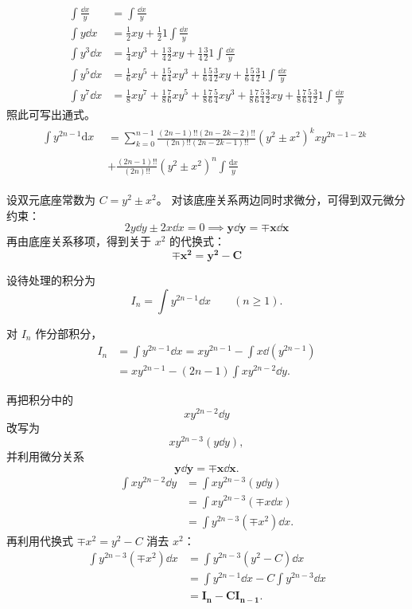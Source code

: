 \begin{theorem}[正奇次幂型]
\vspace{-15pt}
\begin{align*}
\int \frac{\dd x}{y}&=\int \frac{\dd x}{y}\\
\int y\dd x&=\frac12 xy+\frac121\int \frac{\dd x}{y}\\
\int y^3\dd x&=\frac14 xy^3+\frac14\frac32 xy+\frac14\frac321\int\frac{\dd x}{y}\\
\int y^5\dd x&=\frac16 xy^5+\frac16\frac54 xy^3+\frac16\frac54\frac32 xy +\frac16\frac54\frac321\int\frac{\dd x}{y}\\
\int y^7\dd x&=\frac18 xy^7+\frac18\frac76 xy^5+\frac18\frac76\frac54 xy^3+\frac18\frac76\frac54\frac32 xy +\frac18\frac76\frac54\frac321\int\frac{\dd x}{y}
\end{align*}
照此可写出通式。
\begin{align*}\int y^{2n-1}\mathrm{d}x&\begin{aligned}=\sum_{k=0}^{n-1}\frac{(2n-1)!!\left(2n-2k-2\right)!!}{(2n)!!\left(2n-2k-1\right)!!}\left(y^2\pm x^2\right)^kxy^{2n-1-2k}\end{aligned}\\&\begin{aligned}+\frac{(2n-1)!!}{(2n)!!}\left(y^2\pm x^2\right)^n\int\frac{\mathrm{d}x}{y}\end{aligned}\end{align*}
\end{theorem}
设双元底座常数为 $C = y^2 \pm x^2$。
对该底座关系两边同时求微分，可得到双元微分约束：
$$ 2y \dd y \pm 2x \dd x = 0 \implies \mathbf{y \dd y = \mp x \dd x} $$
再由底座关系移项，得到关于 $x^2$ 的代换式：
$$ \mathbf{\mp x^2 = y^2 - C} $$

设待处理的积分为
\[
I_n = \int y^{2n-1} \dd x \qquad (n \ge 1).
\]

对 $I_n$ 作分部积分，
\begin{align*}
I_n &= \int y^{2n-1} \dd x = x y^{2n-1} - \int x \dd\left(y^{2n-1}\right) \\
&= x y^{2n-1} - (2n-1) \int x y^{2n-2} \dd y.
\end{align*}

再把积分中的
\[
x y^{2n-2} \dd y
\]
改写为
\[
x y^{2n-3}(y\dd y),
\]
并利用微分关系
\[
\mathbf{y \dd y = \mp x \dd x}.
\]
\begin{align*}
\int x y^{2n-2} \dd y &= \int x y^{2n-3} (y \dd y) \\
&= \int x y^{2n-3} (\mp x \dd x) \\
&= \int y^{2n-3} (\mp x^2) \dd x.
\end{align*}
再利用代换式 $\mp x^2 = y^2 - C$ 消去 $x^2$：
\begin{align*}
\int y^{2n-3} (\mp x^2) \dd x &= \int y^{2n-3} (y^2 - C) \dd x \\
&= \int y^{2n-1} \dd x - C \int y^{2n-3} \dd x \\
&= \mathbf{I_n - C I_{n-1}}.
\end{align*}

